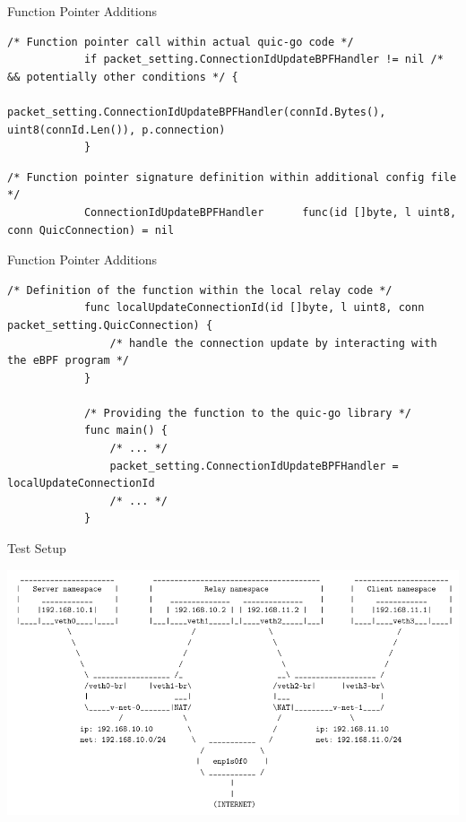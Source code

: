 \documentclass[shortpres,aspectratio=43]{beamer}
\begin{document}
\begin{frame}[fragile]{Function Pointer Additions}
    \begin{minipage}{\textwidth}
        \begin{lstlisting}[style=GoStyle,
            caption=Function-pointer addition to the quic-go library.]
            /* Function pointer call within actual quic-go code */
            if packet_setting.ConnectionIdUpdateBPFHandler != nil /* && potentially other conditions */ {
                packet_setting.ConnectionIdUpdateBPFHandler(connId.Bytes(), uint8(connId.Len()), p.connection)
            }
        \end{lstlisting}
    \end{minipage}

    \begin{minipage}{\textwidth}
        \begin{lstlisting}[style=GoStyle, caption=The signature will be defined within the library itself.]
            /* Function pointer signature definition within additional config file */
            ConnectionIdUpdateBPFHandler      func(id []byte, l uint8, conn QuicConnection) = nil
        \end{lstlisting}
    \end{minipage}
\end{frame}

\begin{frame}[fragile]{Function Pointer Additions}
    \begin{minipage}{\textwidth}
        \begin{lstlisting}[style=GoStyle, label=changes:definition-function-pointer, caption=An example of how the addition looks on the relay side.]
            /* Definition of the function within the local relay code */
            func localUpdateConnectionId(id []byte, l uint8, conn packet_setting.QuicConnection) {
                /* handle the connection update by interacting with the eBPF program */
            }   

            /* Providing the function to the quic-go library */
            func main() {
                /* ... */
                packet_setting.ConnectionIdUpdateBPFHandler = localUpdateConnectionId
                /* ... */
            }
        \end{lstlisting}
    \end{minipage}
\end{frame}

\begin{frame}{Test Setup}
    \begin{minipage}{\textwidth}
        \centering
        \includegraphics[scale=0.7]{figures/ns-setup.pdf}
    \end{minipage}
\end{frame}
\end{document}
